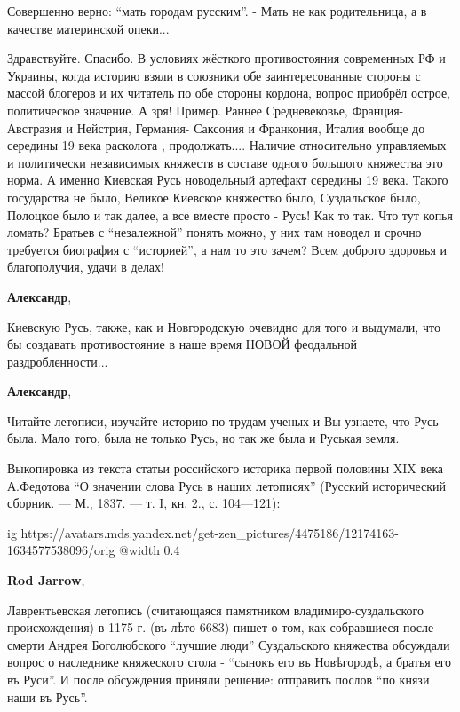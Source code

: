 \begin{itemize}

Совершенно верно: \enquote{мать городам русским}. - Мать не как родительница, а в качестве материнской опеки...


Здравствуйте. Спасибо. В условиях жёсткого противостояния современных РФ и
Украины, когда историю взяли в союзники обе заинтересованные стороны с массой
блогеров и их читатель по обе стороны кордона, вопрос приобрёл острое,
политическое значение. А зря! Пример. Раннее Средневековье, Франция- Австразия
и Нейстрия, Германия- Саксония и Франкония, Италия вообще до середины 19 века
расколота , продолжать.... Наличие относительно управляемых и политически
независимых княжеств в составе одного большого княжества это норма. А именно
Киевская Русь новодельный артефакт середины 19 века. Такого государства не
было, Великое Киевское княжество было, Суздальское было, Полоцкое было и так
далее, а все вместе просто - Русь! Как то так. Что тут копья ломать? Братьев с
\enquote{незалежной} понять можно, у них там новодел и срочно требуется биография с
\enquote{историей}, а нам то это зачем? Всем доброго здоровья и благополучия, удачи в
делах!

\begin{itemize} %
\textbf{Александр}, 

Киевскую Русь, также, как и Новгородскую очевидно для того и выдумали, что бы
создавать противостояние в наше время НОВОЙ феодальной раздробленности...

\textbf{Александр}, 

Читайте летописи, изучайте историю по трудам ученых и Вы узнаете, что Русь
была. Мало того, была не только Русь, но так же была и Руськая земля.

Выкопировка из текста статьи российского историка первой половины XIX века
А.Федотова \enquote{О значении слова Русь в наших летописях} (Русский
исторический сборник. — М., 1837. — т. I, кн. 2., с. 104—121):

\ifcmt
  ig https://avatars.mds.yandex.net/get-zen_pictures/4475186/12174163-1634577538096/orig
  @width 0.4
\fi

\textbf{Rod Jarrow}, 

Лаврентьевская летопись (считающаяся памятником владимиро-суздальского
происхождения) в 1175 г. (въ лѣто 6683) пишет о том, как собравшиеся после
смерти Андрея Боголюбского \enquote{лучшие люди} Суздальского княжества обсуждали
вопрос о наследнике княжеского стола - \enquote{сынокъ его въ Новѣгородѣ, а братья его
въ Руси}. И после обсуждения приняли решение: отправить послов \enquote{по князи наши
въ Русь}.


\end{itemize}
\end{itemize}
